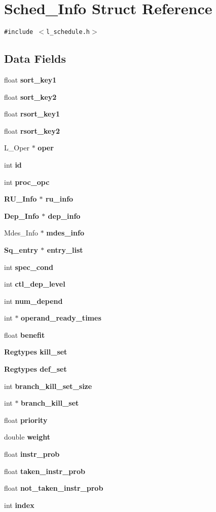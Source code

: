 \section{Sched\_\-Info Struct Reference}
\label{structSched__Info}
{\tt \#include $<$l\_\-schedule.h$>$}

\subsection*{Data Fields}
\begin{CompactItemize}
\item 
float \bf{sort\_\-key1}
\item 
float \bf{sort\_\-key2}
\item 
float \bf{rsort\_\-key1}
\item 
float \bf{rsort\_\-key2}
\item 
L\_\-Oper $\ast$ \bf{oper}
\item 
int \bf{id}
\item 
int \bf{proc\_\-opc}
\item 
\bf{RU\_\-Info} $\ast$ \bf{ru\_\-info}
\item 
\bf{Dep\_\-Info} $\ast$ \bf{dep\_\-info}
\item 
Mdes\_\-Info $\ast$ \bf{mdes\_\-info}
\item 
\bf{Sq\_\-entry} $\ast$ \bf{entry\_\-list}
\item 
int \bf{spec\_\-cond}
\item 
int \bf{ctl\_\-dep\_\-level}
\item 
int \bf{num\_\-depend}
\item 
int $\ast$ \bf{operand\_\-ready\_\-times}
\item 
float \bf{benefit}
\item 
\bf{Regtypes} \bf{kill\_\-set}
\item 
\bf{Regtypes} \bf{def\_\-set}
\item 
int \bf{branch\_\-kill\_\-set\_\-size}
\item 
int $\ast$ \bf{branch\_\-kill\_\-set}
\item 
float \bf{priority}
\item 
double \bf{weight}
\item 
float \bf{instr\_\-prob}
\item 
float \bf{taken\_\-instr\_\-prob}
\item 
float \bf{not\_\-taken\_\-instr\_\-prob}
\item 
int \bf{index}
\item 

\end{CompactItemize}
